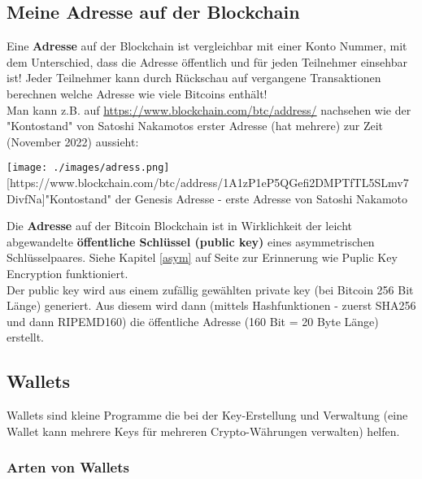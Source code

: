 \documentclass[10pt,a4paper,titlepage]{article}
\begin{document}
\subsection{Meine Adresse auf der Blockchain}
Eine \textbf{Adresse} auf der Blockchain ist vergleichbar mit einer Konto Nummer, mit dem Unterschied, dass die Adresse öffentlich und für jeden Teilnehmer einsehbar ist! Jeder Teilnehmer kann durch Rückschau auf vergangene Transaktionen berechnen welche Adresse wie viele Bitcoins enthält!\\
Man kann z.B. auf \href{https://www.blockchain.com/btc/address/}{\color{blue}https://www.blockchain.com/btc/address/} nachsehen wie der "Kontostand" von Satoshi Nakamotos erster Adresse (hat mehrere) zur Zeit (November 2022) aussieht:
\begin{center}
\texttt{[image: ./images/adress.png]}
[https://www.blockchain.com/btc/address/1A1zP1eP5QGefi2DMPTfTL5SLmv7DivfNa]{"Kontostand" der Genesis Adresse - erste Adresse von Satoshi Nakamoto}
\end{center}
Die \textbf{Adresse} auf der Bitcoin Blockchain ist in Wirklichkeit der leicht abgewandelte \textbf{öffentliche Schlüssel (public key)} eines asymmetrischen Schlüsselpaares. Siehe Kapitel \ref{asym} auf Seite \pageref{asym} zur Erinnerung wie Puplic Key Encryption funktioniert.\\
Der public key wird aus einem zufällig gewählten private key (bei Bitcoin 256 Bit Länge) generiert.   
Aus diesem wird dann (mittels Hashfunktionen - zuerst SHA256 und dann RIPEMD160) die öffentliche Adresse (160 Bit = 20 Byte Länge) erstellt.
\subsection{Wallets}
Wallets sind kleine Programme die bei der Key-Erstellung und Verwaltung (eine Wallet kann mehrere Keys für mehreren Crypto-Währungen verwalten) helfen.
\begin{center}
\end{center}
\subsubsection{Arten von Wallets}
\end{document}
